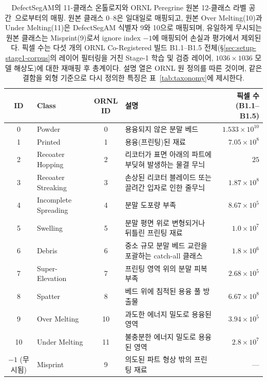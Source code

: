 \begin{table}[t]
\centering
\caption{DefectSegAM의 11-클래스 온톨로지와 ORNL Peregrine 원본
12-클래스 라벨 공간~\cite{Scime2020DSCNN,ORNL_CoRegistered_Dataset}으로부터의 매핑. 원본
클래스 0--8은 일대일로 매핑되고, 원본 Over Melting(10)과 Under
Melting(11)은 DefectSegAM 식별자 9와 10으로 매핑되며, 유일하게
무시되는 원본 클래스는 Misprint(9)로서 ignore index $-1$에 매핑되어
손실과 평가에서 제외된다. 픽셀 수는 다섯 개의 ORNL Co-Registered 빌드
B1.1--B1.5 전체(\S\ref{sec:setup-stage1-corpus}의 레이어 필터링을
거친 Stage-1 학습 및 검증 레이어, $1036 \times 1036$ 모델 해상도)에
대한 재매핑 후 총계이다. 설명 열은 ORNL 원 정의를 따른 것이며, 같은 결함을 외형
기준으로 다시 정의한 특징은 표~\ref{tab:taxonomy}에 제시한다.}
\label{tab:classes}
\footnotesize
\setlength{\tabcolsep}{3pt}
\begin{tabularx}{\textwidth}{@{}clc>{\raggedright\arraybackslash}Xr@{}}
\toprule
ID & Class & \makecell{ORNL\\ID} & 설명 & \makecell{픽셀 수\\(B1.1--B1.5)} \\
\midrule
0  & Powder               & 0  & 용융되지 않은 분말 베드 & $1.533 \times 10^{10}$ \\
1  & Printed              & 1  & 용융(프린팅)된 재료 & $7.05 \times 10^{8}$ \\
2  & Recoater Hopping     & 2  & 리코터가 표면 아래의 파트에 부딪혀 발생하는 물결 무늬 & $25$ \\
3  & Recoater Streaking   & 3  & 손상된 리코터 블레이드 또는 끌려간 입자로 인한 줄무늬 & $1.87 \times 10^{8}$ \\
4  & Incomplete Spreading & 4  & 분말 도포량 부족 & $8.67 \times 10^{5}$ \\
5  & Swelling             & 5  & 분말 평면 위로 변형되거나 뒤틀린 프린팅 재료 & $1.0 \times 10^{7}$ \\
6  & Debris               & 6  & 중소 규모 분말 베드 교란을 포괄하는 catch-all 클래스 & $1.8 \times 10^{6}$ \\
7  & Super-Elevation      & 7  & 프린팅 영역 위의 분말 피복 부족 & $2.68 \times 10^{5}$ \\
8  & Spatter              & 8  & 베드 위에 침적된 용융 풀 방출물 & $6.67 \times 10^{8}$ \\
9  & Over Melting         & 10 & 과도한 에너지 밀도로 용융된 영역 & $3.94 \times 10^{5}$ \\
10 & Under Melting        & 11 & 불충분한 에너지 밀도로 용융된 영역 & $2.8 \times 10^{7}$ \\
\midrule
$-1$ (무시됨) & Misprint & 9  & 의도된 파트 형상 밖의 프린팅 재료 & --- \\
\bottomrule
\end{tabularx}
\end{table}

